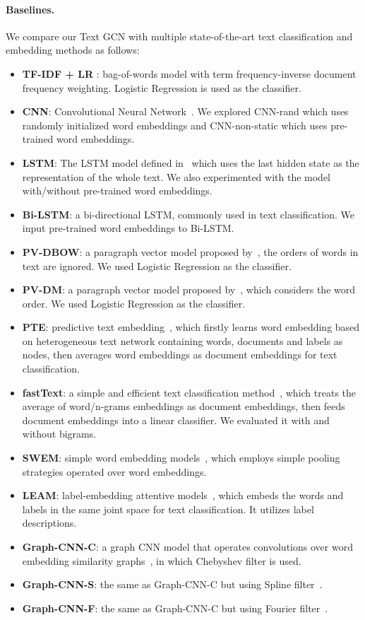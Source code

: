 \documentclass[letterpaper]{article} \usepackage{aaai19}  \usepackage{times}  \usepackage{helvet}  \usepackage{courier}  \usepackage{url}  \usepackage{graphicx}  \frenchspacing  \usepackage{amsmath}
\begin{document}
\paragraph{Baselines.}
We compare our Text GCN with multiple state-of-the-art text classification and embedding methods as follows:
\begin{itemize}
\item \textbf{TF-IDF + LR} : bag-of-words model with term frequency-inverse document frequency weighting. Logistic Regression is used as the classifier. 
\item \textbf{CNN}: Convolutional Neural Network~\cite{kim2014convolutional}. We explored CNN-rand which uses randomly initialized word embeddings and CNN-non-static which uses pre-trained word embeddings.
\item \textbf{LSTM}: The LSTM model defined in~\cite{liu2016recurrent} which uses the last hidden state as  the representation of the whole text. We also experimented with the model with/without pre-trained word embeddings.
\item \textbf{Bi-LSTM}: a bi-directional LSTM, commonly used in text classification. We input pre-trained word embeddings to Bi-LSTM.
\item \textbf{PV-DBOW}: a paragraph vector model proposed by~\cite{le2014distributed}, the orders of words in text are ignored. We used Logistic Regression as the classifier.
\item \textbf{PV-DM}: a paragraph vector model proposed by~\cite{le2014distributed}, which considers the word order. We used Logistic Regression as the classifier.
\item \textbf{PTE}: predictive text embedding~\cite{tang2015pte}, which firstly learns word embedding based on heterogeneous text network containing words, documents and labels as nodes, then averages word embeddings as document embeddings for text classification. 
\item \textbf{fastText}: a simple and efficient text classification method~\cite{joulin2017bag}, which treats the average of word/n-grams embeddings as document embeddings, then feeds document embeddings into a linear classifier. We evaluated it with and without bigrams. 
\item \textbf{SWEM}: simple word embedding models~\cite{Shen2018Baseline}, which employs simple pooling strategies operated over word embeddings.
\item \textbf{LEAM}: label-embedding attentive models~\cite{P18-1216}, which embeds the words and labels in the same joint space for text classification. It utilizes label descriptions.
\item \textbf{Graph-CNN-C}: a graph CNN model that operates convolutions over word embedding similarity graphs~\cite{defferrard2016convolutional}, in which Chebyshev filter is used.
\item \textbf{Graph-CNN-S}: the same as Graph-CNN-C but using Spline filter~\cite{bruna2013spectral}.
\item \textbf{Graph-CNN-F}: the same as Graph-CNN-C but using Fourier filter~\cite{henaff2015deep}.
\end{itemize}
\end{document}
